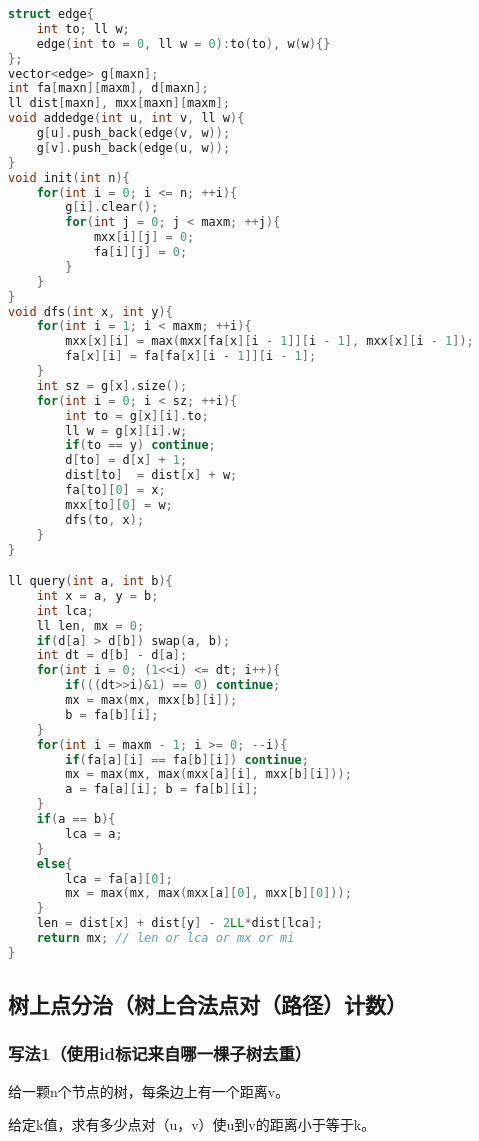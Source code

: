 \begin{lstlisting}[language=C++]
struct edge{
    int to; ll w;
    edge(int to = 0, ll w = 0):to(to), w(w){}
};
vector<edge> g[maxn];
int fa[maxn][maxm], d[maxn];
ll dist[maxn], mxx[maxn][maxm];
void addedge(int u, int v, ll w){
    g[u].push_back(edge(v, w));
    g[v].push_back(edge(u, w));
}
void init(int n){
    for(int i = 0; i <= n; ++i){
        g[i].clear();
        for(int j = 0; j < maxm; ++j){
            mxx[i][j] = 0;
            fa[i][j] = 0;
        }
    }
}
void dfs(int x, int y){
    for(int i = 1; i < maxm; ++i){
        mxx[x][i] = max(mxx[fa[x][i - 1]][i - 1], mxx[x][i - 1]);
        fa[x][i] = fa[fa[x][i - 1]][i - 1];
    }
    int sz = g[x].size();
    for(int i = 0; i < sz; ++i){
        int to = g[x][i].to;
        ll w = g[x][i].w;
        if(to == y) continue;
        d[to] = d[x] + 1;
        dist[to]  = dist[x] + w;
        fa[to][0] = x;
        mxx[to][0] = w;
        dfs(to, x);
    }
}

ll query(int a, int b){
    int x = a, y = b;
    int lca;
    ll len, mx = 0;
    if(d[a] > d[b]) swap(a, b);
    int dt = d[b] - d[a];
    for(int i = 0; (1<<i) <= dt; i++){
        if(((dt>>i)&1) == 0) continue;
        mx = max(mx, mxx[b][i]);
        b = fa[b][i];
    }
    for(int i = maxm - 1; i >= 0; --i){
        if(fa[a][i] == fa[b][i]) continue;
        mx = max(mx, max(mxx[a][i], mxx[b][i]));
        a = fa[a][i]; b = fa[b][i];
    }
    if(a == b){
        lca = a;
    }
    else{
        lca = fa[a][0];
        mx = max(mx, max(mxx[a][0], mxx[b][0]));
    }
    len = dist[x] + dist[y] - 2LL*dist[lca];
    return mx; // len or lca or mx or mi
}
\end{lstlisting}

\subsection{树上点分治（树上合法点对（路径）计数）}

\subsubsection{写法1（使用id标记来自哪一棵子树去重）}

给一颗n个节点的树，每条边上有一个距离v。

给定k值，求有多少点对（u，v）使u到v的距离小于等于k。

